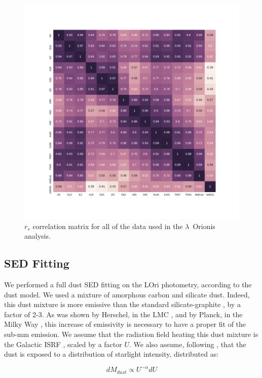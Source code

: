   \begin{figure}
    \label{fig:orionis-corr}
    \includegraphics[width=\textwidth]{../Plots/ch_lori/Lori_corrmatrix_I.pdf}
    \centering
    \caption{$r_{s}$ correlation matrix for all of the data used in the $\lambda$~Orionis analysis.}
  \end{figure}

  \subsection{SED Fitting}
    We performed a full dust SED fitting on the LOri photometry, according to the \cite{galliano11} dust model. We used a mixture of amorphous carbon and silicate dust. Indeed, this dust mixture is more emissive than the standard silicate-graphite \citep{draine07}, by a factor of 2-3. As was shown by Herschel, in the LMC \citep{galliano11}, and by Planck, in the Milky Way \citep{planck16}, this increase of emissivity is necessary to have a proper fit of the sub-mm emission. We assume that the radiation field heating this dust mixture is the Galactic ISRF \citep{math83}, scaled by a factor $U$. We also assume, following \cite{dale01}, that the dust is exposed to a distribution of starlight intensity, distributed as:

    \begin{equation}
       \label{eq:U}
         dM_{dust}\propto{} U^{-\alpha}dU
    \end{equation}

